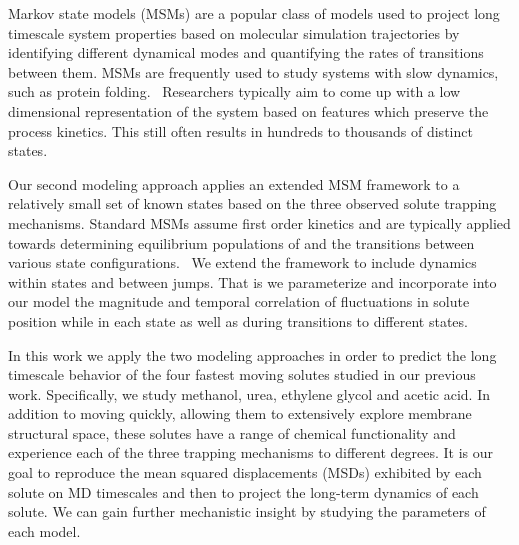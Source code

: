 \documentclass{article}
\begin{document}

  Markov state models (MSMs) are a popular class of models used to project long timescale
  system properties based on molecular simulation trajectories by identifying
  different dynamical modes and quantifying the rates of transitions between them.
  MSMs are frequently used to study systems with slow dynamics, such as protein 
  folding.~\cite{snow_how_2005,chodera_automatic_2007} Researchers typically aim to 
  come up with a low dimensional representation of the system based on features 
  which preserve the process kinetics. This still often results in hundreds to thousands
  of distinct states.~\cite{chodera_markov_2014}

  Our second modeling approach applies an extended MSM framework to a relatively 
  small set of known states based on the three observed solute trapping mechanisms.
  Standard MSMs assume first order kinetics and are typically applied 
  towards determining equilibrium populations of and the transitions between 
  various state configurations.~\cite{bowman_using_2009} We extend the framework
  to include dynamics within states and between jumps. That is we parameterize 
  and incorporate into our model the magnitude and temporal correlation of
  fluctuations in solute position while in each state as well as during transitions
  to different states. 
  
  In this work we apply the two modeling approaches in order to predict the long
  timescale behavior of the four fastest moving solutes studied in our previous work.
  Specifically, we study methanol, urea, ethylene glycol and acetic acid. In addition
  to moving quickly, allowing them to extensively explore membrane structural space,
  these solutes have a range of chemical functionality and experience each of the 
  three trapping mechanisms to different degrees. It is our goal to reproduce
  the mean squared displacements (MSDs) exhibited by each solute on MD timescales and
  then to project the long-term dynamics of each solute. We can gain further
  mechanistic insight by studying the parameters of each model. 
  
\end{document}
